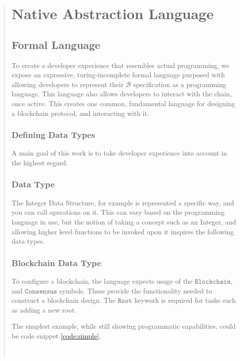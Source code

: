 \documentclass[12pt, titlepage, twocolumn]{report}
\begin{document}
\begin{quotation}
\chapter{Native Abstraction Language}


\section{Formal Language}
To create a developer experience that resembles actual programming, we expose an expressive, turing-incomplete formal language purposed with allowing developers to represent their \( \boldsymbol{\mathcal{B}} \) specification as a programming language. This language also allows developers to interact with the chain, once active. This creates one common, fundamental language for designing a blockchain protocol, and interacting with it. 

\subsection{Defining Data Types}
A main goal of this work is to take developer experience into account in the highest regard.  

\subsection{Data Type}
The Integer Data Structure, for example is represented a specific way, and you can call operations on it. This can vary based on the programming language in use, but the notion of taking a concept such as an Integer, and allowing higher level functions to be invoked upon it inspires the following data types. 

\subsection{Blockchain Data Type}
To configure a blockchain, the language expects usage of the \(\texttt{Blockchain}\), and \(\texttt{Consensus}\) symbols. These provide the functionality needed to construct a blockchain design. The \(\texttt{Root}\) keywork is required for tasks such as adding a new root.

The simplest example, while still showing programmatic capabilities, could be code snippet \ref{code:simple},  

\begin{listing}[ht]
\begin{minipage}{\linewidth}
\begin{lstlisting}


\end{lstlisting}
\end{minipage}
\end{listing}
\end{quotation}
\end{document}
